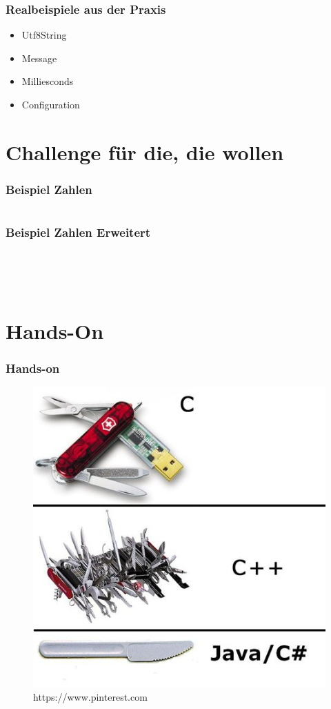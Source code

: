 \begin{frame}[fragile]
	\frametitle{Realbeispiele aus der Praxis}
	\begin{itemize}
		\item Utf8String
		\item Message
		\item Milliesconds
		\item Configuration
	\end{itemize}
\end{frame}

\section{Challenge für die, die wollen}
\begin{frame}[fragile]
	\frametitle{Beispiel Zahlen}
	\inputminted[fontsize=\tiny,firstline=5,lastline=30,framesep=5mm]{cpp}{../code/src/ausblick/01.cpp}
\end{frame}

\begin{frame}[fragile]
	\frametitle{Beispiel Zahlen Erweitert}
	\inputminted[fontsize=\tiny,firstline=55,lastline=63,framesep=5mm]{cpp}{../code/src/ausblick/02.cpp}
	\inputminted[fontsize=\tiny,firstline=65,lastline=65,framesep=5mm]{cpp}{../code/src/ausblick/02.cpp}
	\inputminted[fontsize=\tiny,firstline=67,lastline=67,framesep=5mm]{cpp}{../code/src/ausblick/02.cpp}
	\inputminted[fontsize=\tiny,firstline=69,lastline=69,framesep=5mm]{cpp}{../code/src/ausblick/02.cpp}
	\inputminted[fontsize=\tiny,firstline=71,lastline=72,framesep=5mm]{cpp}{../code/src/ausblick/02.cpp}
\end{frame}

\section{Hands-On}

\begin{frame}[fragile]
	\frametitle{Hands-on}
	\begin{figure}
		\includegraphics[width=0.6\linewidth]{img/hands_on.jpg}
		\caption{https://www.pinterest.com}
	\end{figure}%
\end{frame}
